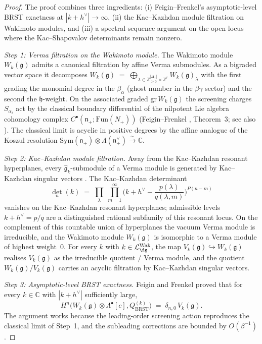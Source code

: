 \begin{proof}
The proof combines three ingredients: (i) Feigin--Frenkel's
asymptotic-level BRST exactness at $|k+h^\vee|\to\infty$, (ii) the
Kac--Kazhdan module filtration on Wakimoto modules, and (iii) a
spectral-sequence argument on the open locus where the
Kac--Shapovalov determinants remain nonzero.

\emph{Step 1: Verma filtration on the Wakimoto module.}
The Wakimoto module $W_k(\mathfrak{g})$ admits a canonical filtration
by affine Verma submodules. As a bigraded vector space it decomposes
\(
W_k(\mathfrak{g})
\;=\;
\bigoplus_{\lambda\in\mathbb{Z}_{\geq 0}^{|\Delta_+|}\times\mathbb{Z}^r}
W_k(\mathfrak{g})_\lambda
\)
with the first grading the monomial degree in the $\beta_\alpha$
(ghost number in the $\beta\gamma$ sector) and the second the
$\mathfrak{h}$-weight. On the associated graded
$\mathrm{gr}\, W_k(\mathfrak{g})$ the screening charges
$S_{\alpha_i}$ act by the classical boundary differential of the
nilpotent Lie algebra cohomology complex
$C^\bullet(\mathfrak{n}_+;\mathrm{Fun}(N_+))$
(Feigin--Frenkel \cite{FeiginFrenkel90bosonization},
Theorem~3; see also \cite[Chapter~15]{FBZ04}). The classical limit
is acyclic in positive degrees by the affine analogue of the
Koszul resolution
$\mathrm{Sym}(\mathfrak{n}_+)\otimes\Lambda(\mathfrak{n}_+^\vee)
\xrightarrow{\sim}\mathbb{C}$.

\emph{Step 2: Kac--Kazhdan module filtration.}
Away from the Kac--Kazhdan resonant hyperplanes, every
$\widehat{\mathfrak{g}}_k$-submodule of a Verma module is generated
by Kac--Kazhdan singular vectors
\cite[Theorem~2]{KacKazhdan79}. The
Kac--Kazhdan determinant
\[
\det_n(k)
\;=\;
\prod_{\lambda}\;\prod_{m=1}^{\infty}
\bigl(k + h^\vee - \frac{p(\lambda)}{q(\lambda,m)}\bigr)^{P(n-m)}
\]
vanishes on the Kac--Kazhdan resonant hyperplanes; admissible levels
$k+h^\vee=p/q$ are a distinguished rational subfamily of this
resonant locus. On the complement of this countable union of
hyperplanes the vacuum Verma module is irreducible, and the Wakimoto
module $W_k(\mathfrak{g})$ is isomorphic to a Verma module of
highest weight~$0$. For every $k$ with
$k\in\mathcal L^{\mathrm{Wak}}_{\fg}$, the map
$V_k(\mathfrak{g})\hookrightarrow W_k(\mathfrak{g})$ realises
$V_k(\mathfrak{g})$ as the irreducible quotient / Verma module,
and the quotient $W_k(\mathfrak{g})/V_k(\mathfrak{g})$ carries an
acyclic filtration by Kac--Kazhdan singular vectors.

\emph{Step 3: Asymptotic-level BRST exactness.}
Feigin and Frenkel proved
\cite[Theorem~4.3.2]{FeiginFrenkel90bosonization} that for every
$k\in\mathbb{C}$ with $|k+h^\vee|$ sufficiently large,
\[
H^n\bigl(W_k(\mathfrak{g})\otimes\Lambda^\bullet[c],
Q_{\mathrm{BRST}}^{(k)}\bigr)
\;=\;\delta_{n,0}\,V_k(\mathfrak{g}).
\]
The argument works because the leading-order screening action
reproduces the classical limit of Step~1, and the subleading
corrections are bounded by $O(\beta^{-1})$.


\end{proof}
